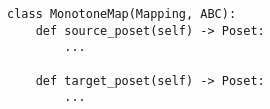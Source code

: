\par\begin{minipage}{60ex}
\begin{verbatim}
class MonotoneMap(Mapping, ABC):
    def source_poset(self) -> Poset:
        ...

    def target_poset(self) -> Poset:
        ...
\end{verbatim}
\end{minipage}\par